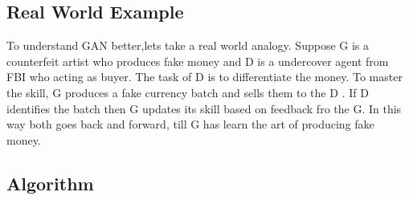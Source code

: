 \subsection{Real World Example}
To understand GAN better,lets take a real world analogy. Suppose G is a counterfeit artist who produces fake money and D is a undercover agent from FBI who acting as buyer. The task of D is to differentiate the money. To master the skill, G produces a fake currency batch and sells them to the D . If D identifies the batch then G updates its skill based on feedback fro the G. In this way  both goes back and forward, till G has learn the art of producing fake money.
\subsection{Algorithm}



